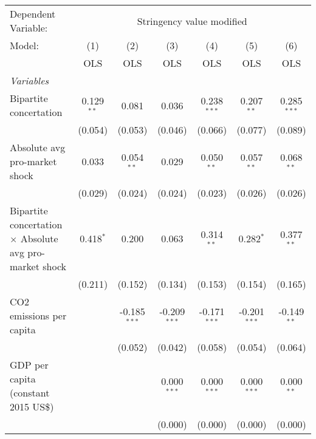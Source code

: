 
\begingroup
\centering
\begin{tabular}{lcccccc}
   \toprule
   Dependent Variable: & \multicolumn{6}{c}{Stringency value modified}\\
   Model:                                                         & (1)          & (2)            & (3)            & (4)            & (5)            & (6)\\  
                                                                  &  OLS         & OLS            & OLS            & OLS            & OLS            & OLS\\  
   \midrule
   \emph{Variables}\\
   Bipartite concertation                                         & 0.129$^{**}$ & 0.081          & 0.036          & 0.238$^{***}$  & 0.207$^{**}$   & 0.285$^{***}$\\   
                                                                  & (0.054)      & (0.053)        & (0.046)        & (0.066)        & (0.077)        & (0.089)\\   
   Absolute avg pro-market shock                                  & 0.033        & 0.054$^{**}$   & 0.029          & 0.050$^{**}$   & 0.057$^{**}$   & 0.068$^{**}$\\   
                                                                  & (0.029)      & (0.024)        & (0.024)        & (0.023)        & (0.026)        & (0.026)\\   
   Bipartite concertation $\times$ Absolute avg pro-market shock  & 0.418$^{*}$  & 0.200          & 0.063          & 0.314$^{**}$   & 0.282$^{*}$    & 0.377$^{**}$\\   
                                                                  & (0.211)      & (0.152)        & (0.134)        & (0.153)        & (0.154)        & (0.165)\\   
   CO2 emissions per capita                                       &              & -0.185$^{***}$ & -0.209$^{***}$ & -0.171$^{***}$ & -0.201$^{***}$ & -0.149$^{**}$\\   
                                                                  &              & (0.052)        & (0.042)        & (0.058)        & (0.054)        & (0.064)\\   
   GDP per capita (constant 2015 US\$)                            &              &                & 0.000$^{***}$  & 0.000$^{***}$  & 0.000$^{***}$  & 0.000$^{**}$\\   
                                                                  &              &                & (0.000)        & (0.000)        & (0.000)        & (0.000)\\   

\end{tabular}
